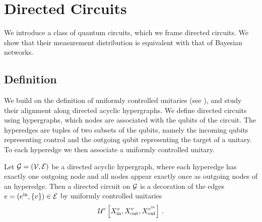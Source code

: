 \section{Directed Circuits}

We introduce a class of quantum circuits, which we frame directed circuits.
We show that their measurement distribution is equivalent with that of Bayesian networks.


\subsection{Definition}

We build on the definition of uniformly controlled unitaries (see \cite{mottonen_transformation_2005}), and study their alignment along directed acyclic hypergraphs.
We define directed circuits using hypergraphs, which nodes are associated with the qubits of the circuit.
The hyperedges are tuples of two subsets of the qubits, namely the incoming qubits representing control and the outgoing qubit representing the target of a unitary.
To each hyperedge we then associate a uniformly controlled unitary.

\begin{definition}
    Let $\mathcal{G}=(\mathcal{V},\mathcal{E})$ be a directed acyclic hypergraph, where each hyperedge has exactly one outgoing node and all nodes appear exactly once as outgoing nodes of an hyperedge.
    Then a directed circuit on $\mathcal{G}$ is a decoration of the edges $e=(e^{\mathrm{in}},\{v\})\in\mathcal{E}$ by uniformly controlled unitaries
    \begin{align*}
        \mathcal{U}^{e}\left[X_{\mathrm{in}}^{v},X_{\mathrm{out}}^{v},X_{\mathrm{out}}^{e^{\mathrm{in}}}\right] \, .
    \end{align*}
\end{definition}



